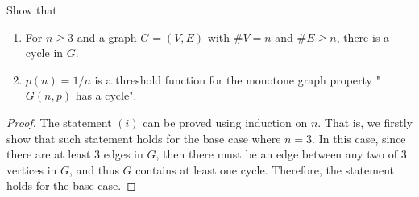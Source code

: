 \begin{problem}
  Show that 
  \begin{enumerate}[label=\arabic*)]
    \item For $n \geq 3$ and a graph $G=(V,E)$ with $\# V = n$ and $\# E \geq n$, there is a cycle in $G$.
    \item $p(n) = 1/n$ is a threshold function for the monotone graph property "$G(n,p)$ has a cycle".
  \end{enumerate}
\end{problem}
\begin{proof}
  The statement $(i)$ can be proved using induction on $n$. That is, we firstly show that such statement holds for the base case where $n=3$. In this case, since there are at least $3$ edges in $G$, then there must be an edge between any two of $3$ vertices in $G$, and thus $G$ contains at least one cycle. Therefore, the statement holds for the base case.


\end{proof}
